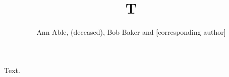 \documentclass{llncs}
\begin{document}
\title{T}
\author{Ann Able, (deceased), Bob Baker and [corresponding author]}
\maketitle
Text.
\end{document}
